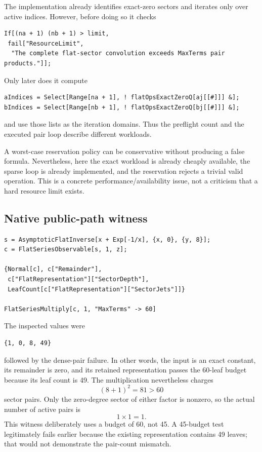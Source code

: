 \documentclass[11pt,a4paper]{article}
\newcommand{\code}[1]{\texttt{\detokenize{#1}}}
\begin{document}
The implementation already identifies exact-zero sectors and iterates only over active indices. However, before doing so it checks
\begin{lstlisting}
If[(na + 1) (nb + 1) > limit,
 fail["ResourceLimit",
  "The complete flat-sector convolution exceeds MaxTerms pair products."]];
\end{lstlisting}
Only later does it compute
\begin{lstlisting}
aIndices = Select[Range[na + 1], ! flatOpsExactZeroQ[aj[[#]]] &];
bIndices = Select[Range[nb + 1], ! flatOpsExactZeroQ[bj[[#]]] &];
\end{lstlisting}
and use those lists as the iteration domains. Thus the preflight count and the executed pair loop describe different workloads.

A worst-case reservation policy can be conservative without producing a false formula. Nevertheless, here the exact workload is already cheaply available, the sparse loop is already implemented, and the reservation rejects a trivial valid operation. This is a concrete performance/availability issue, not a criticism that a hard resource limit exists.

\subsection{Native public-path witness}
\begin{lstlisting}
s = AsymptoticFlatInverse[x + Exp[-1/x], {x, 0}, {y, 8}];
c = FlatSeriesObservable[s, 1, z];

{Normal[c], c["Remainder"],
 c["FlatRepresentation"]["SectorDepth"],
 LeafCount[c["FlatRepresentation"]["SectorJets"]]}

FlatSeriesMultiply[c, 1, "MaxTerms" -> 60]
\end{lstlisting}
The inspected values were
\begin{lstlisting}
{1, 0, 8, 49}
\end{lstlisting}
followed by the dense-pair \code{ResourceLimit} failure. In other words, the input is an exact constant, its remainder is zero, and its retained representation passes the 60-leaf budget because its leaf count is 49. The multiplication nevertheless charges
\[
 (8+1)^2=81>60
\]
sector pairs. Only the zero-degree sector of either factor is nonzero, so the actual number of active pairs is
\[
 1\times1=1.
\]
This witness deliberately uses a budget of 60, not 45. A 45-budget test legitimately fails earlier because the existing representation contains 49 leaves; that would not demonstrate the pair-count mismatch.
\end{document}
